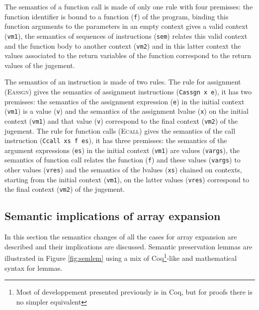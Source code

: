\documentclass{article}
\begin{document}
\smallskip

The semantics of a function call is made of only one rule with four premisses:
the function identifier is bound to a function (\texttt{f}) of the program,
binding this function arguments to the parameters in an empty context gives a
valid context (\texttt{vm1}), the semantics of sequences of instructions
(\texttt{sem}) relates this valid context and the function body to another
context (\texttt{vm2}) and in this latter context the values associated to the
return variables of the function correspond to the return values of the jugement.

\smallskip

The semantics of an instruction is made of two rules. The rule for assignment
(\textsc{Eassgn}) gives the semantics of assignment instructions
(\texttt{Cassgn x e}), it has two premisses: the semantics of the assignment
expression (\texttt{e}) in the initial context (\texttt{vm1}) is a value
(\texttt{v}) and the semantics of the assignment lvalue (\texttt{x}) on the
initial context (\texttt{vm1}) and that value (\texttt{v}) correspond to the
final context (\texttt{vm2}) of the jugement. The rule for function calls
(\textsc{Ecall}) gives the semantics of the call instruction
(\texttt{Ccall xs f es}), it has three premisses: the semantics of the argument
expressions (\texttt{es}) in the initial context (\texttt{vm1}) are values
(\texttt{vargs}), the semantics of function call relates the function
(\texttt{f}) and these values (\texttt{vargs}) to other values (\texttt{vres})
and the semantics of the lvalues (\texttt{xs}) chained on contexts, starting
from the initial context (\texttt{vm1}), on the latter values (\texttt{vres})
correspond to the final context (\texttt{vm2}) of the jugement.


\subsection{Semantic implications of array expansion}

In this section the semantics changes of all the cases for array expansion are
described and their implications are discussed. Semantic preservation lemmas are
illustrated in Figure \ref{fig:semlem} using a mix of Coq\footnote{Most of
developpement presented previously is in Coq, but for proofs there is no simpler
equivalent}-like and mathematical syntax for lemmas.

\smallskip
\end{document}
